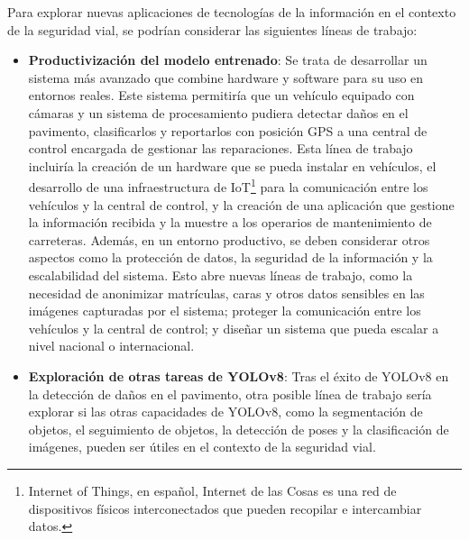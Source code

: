 Para explorar nuevas aplicaciones de tecnologías de la información en el contexto de la seguridad vial, se podrían considerar las siguientes líneas de trabajo:

\begin{itemize}
    \item \textbf{Productivización del modelo entrenado}: Se trata de desarrollar un sistema más avanzado que combine hardware y software para su uso en entornos reales. Este sistema permitiría que un vehículo equipado con cámaras y un sistema de procesamiento pudiera detectar daños en el pavimento, clasificarlos y reportarlos con posición GPS a una central de control encargada de gestionar las reparaciones. Esta línea de trabajo incluiría la creación de un hardware que se pueda instalar en vehículos, el desarrollo de una infraestructura de IoT\footnote{Internet of Things, en español, Internet de las Cosas es una red de dispositivos físicos interconectados que pueden recopilar e intercambiar datos.} para la comunicación entre los vehículos y la central de control, y la creación de una aplicación que gestione la información recibida y la muestre a los operarios de mantenimiento de carreteras. Además, en un entorno productivo, se deben considerar otros aspectos como la protección de datos, la seguridad de la información y la escalabilidad del sistema. Esto abre nuevas líneas de trabajo, como la necesidad de anonimizar matrículas, caras y otros datos sensibles en las imágenes capturadas por el sistema; proteger la comunicación entre los vehículos y la central de control; y diseñar un sistema que pueda escalar a nivel nacional o internacional.
    
    \item \textbf{Exploración de otras tareas de YOLOv8}: Tras el éxito de YOLOv8 en la detección de daños en el pavimento, otra posible línea de trabajo sería explorar si las otras capacidades de YOLOv8, como la segmentación de objetos, el seguimiento de objetos, la detección de poses y la clasificación de imágenes, pueden ser útiles en el contexto de la seguridad vial.
\end{itemize}